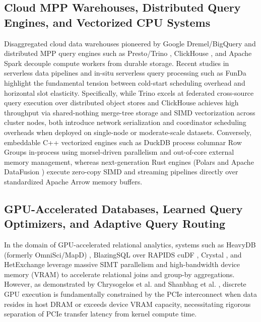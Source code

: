 \documentclass[10pt,a4paper]{article}
\begin{document}
\subsection{Cloud MPP Warehouses, Distributed Query Engines, and Vectorized CPU Systems}
Disaggregated cloud data warehouses pioneered by Google Dremel/BigQuery \cite{melnik2010dremel,melnik2020dremel} and distributed MPP query engines such as Presto/Trino \cite{sethi2019presto}, ClickHouse \cite{schulze2024clickhouse}, and Apache Spark \cite{ahmed2020hibench} decouple compute workers from durable storage. Recent studies in serverless data pipelines \cite{shojaee2024serverless} and in-situ serverless query processing such as FunDa \cite{lounissi2025funda} highlight the fundamental tension between cold-start scheduling overhead and horizontal slot elasticity. Specifically, while Trino \cite{sethi2019presto} excels at federated cross-source query execution over distributed object stores and ClickHouse \cite{schulze2024clickhouse} achieves high throughput via shared-nothing merge-tree storage and SIMD vectorization across cluster nodes, both introduce network serialization and coordinator scheduling overheads when deployed on single-node or moderate-scale datasets. Conversely, embeddable C++ vectorized engines such as DuckDB \cite{raasveldt2019duckdb,kuiper2024duckdb_ooc} process columnar Row Groups in-process using morsel-driven parallelism and out-of-core external memory management, whereas next-generation Rust engines (Polars and Apache DataFusion \cite{lamb2024datafusion}) execute zero-copy SIMD and streaming pipelines directly over standardized Apache Arrow memory buffers.

\subsection{GPU-Accelerated Databases, Learned Query Optimizers, and Adaptive Query Routing}
In the domain of GPU-accelerated relational analytics, systems such as HeavyDB (formerly OmniSci/MapD) \cite{root2019mapd}, BlazingSQL over RAPIDS cuDF \cite{kim2022blazingsql}, Crystal \cite{shanbhag2020crystal}, and HetExchange \cite{chrysogelos2019hetexchange} leverage massive SIMT parallelism and high-bandwidth device memory (VRAM) to accelerate relational joins and group-by aggregations. However, as demonstrated by Chrysogelos et al. \cite{chrysogelos2019hetexchange} and Shanbhag et al. \cite{shanbhag2020crystal}, discrete GPU execution is fundamentally constrained by the PCIe interconnect when data resides in host DRAM or exceeds device VRAM capacity, necessitating rigorous separation of PCIe transfer latency from kernel compute time.
\end{document}
